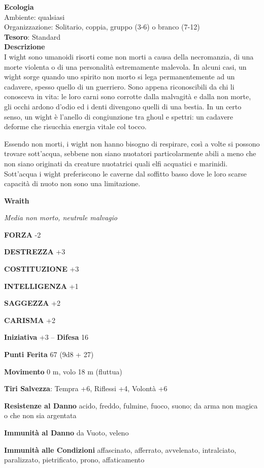 \begin{multicols}{2}
\textbf{Ecologia}\\
Ambiente: qualsiasi\\
Organizzazione: Solitario, coppia, gruppo (3-6) o branco (7-12)\\
\textbf{Tesoro}: Standard\\
\textbf{Descrizione}\\
I wight sono umanoidi risorti come non morti a causa della necromanzia, di una morte violenta o di una personalità estremamente malevola. In alcuni casi, un wight sorge quando uno spirito non morto si lega permanentemente ad un cadavere, spesso quello di un guerriero. Sono appena riconoscibili da chi li conosceva in vita: le loro carni sono corrotte dalla malvagità e dalla non morte, gli occhi ardono d'odio ed i denti divengono quelli di una bestia. In un certo senso, un wight è l'anello di congiunzione tra ghoul e spettri: un cadavere deforme che risucchia energia vitale col tocco.

Essendo non morti, i wight non hanno bisogno di respirare, così a volte si possono trovare sott'acqua, sebbene non siano nuotatori particolarmente abili a meno che non siano originati da creature nuotatrici quali elfi acquatici e marinidi. Sott'acqua i wight preferiscono le caverne dal soffitto basso dove le loro scarse capacità di nuoto non sono una limitazione.

\medskip{}\textbf{Wraith}

\textit{Media non morto, neutrale malvagio}

\textbf{FORZA} -2

\textbf{DESTREZZA} +3

\textbf{COSTITUZIONE} +3

\textbf{INTELLIGENZA} +1

\textbf{SAGGEZZA} +2

\textbf{CARISMA} +2

\textbf{Iniziativa} +3 -- \textbf{Difesa} 16

\textbf{Punti Ferita} 67 (9d8 + 27)

\textbf{Movimento} 0 m, volo 18 m (fluttua)

\textbf{Tiri Salvezza}: Tempra +6, Riflessi +4, Volontà +6

\textbf{Resistenze al Danno} acido, freddo, fulmine, fuoco, suono; da arma non magica o che non sia argentata

\textbf{Immunità al Danno} da Vuoto, veleno

\textbf{Immunità alle Condizioni} affascinato, afferrato, avvelenato, intralciato, paralizzato, pietrificato, prono, affaticamento


\end{multicols}
